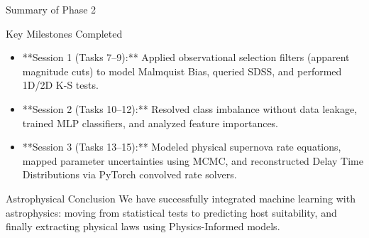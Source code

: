 \documentclass[9pt]{beamer}
\begin{document}
\begin{frame}{Summary of Phase 2}
  \begin{block}{Key Milestones Completed}
    \begin{itemize}
      \item **Session 1 (Tasks 7--9):** Applied observational selection filters (apparent magnitude cuts) to model Malmquist Bias, queried SDSS, and performed 1D/2D K-S tests.
      \item **Session 2 (Tasks 10--12):** Resolved class imbalance without data leakage, trained MLP classifiers, and analyzed feature importances.
      \item **Session 3 (Tasks 13--15):** Modeled physical supernova rate equations, mapped parameter uncertainties using MCMC, and reconstructed Delay Time Distributions via PyTorch convolved rate solvers.
    \end{itemize}
  \end{block}
  \begin{exampleblock}{Astrophysical Conclusion}
    We have successfully integrated machine learning with astrophysics: moving from statistical tests to predicting host suitability, and finally extracting physical laws using Physics-Informed models.
  \end{exampleblock}
\end{frame}
\end{document}

